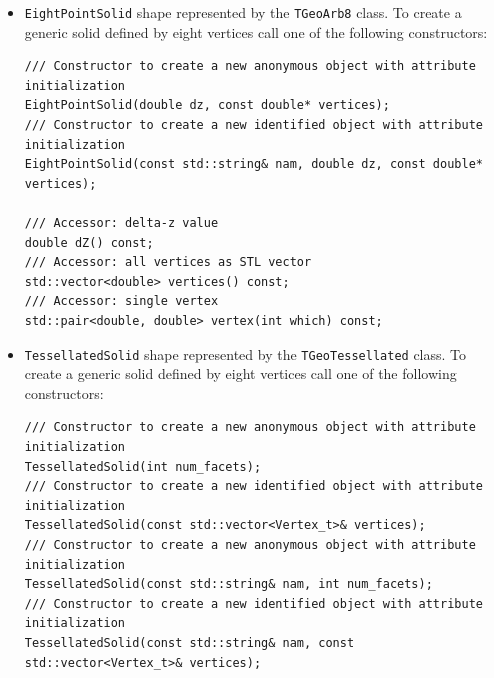 \begin{itemize}
\begin{verbatim}
/// Access vector of x parameters of the various vertices
std::vector<double> x() const;
/// Access vector of x parameters of the various vertices
std::vector<double> y() const;
/// Access vector of z-values of the z plane parameters
std::vector<double> z() const;
/// Access vector of x-offsets of the z plane parameters
std::vector<double> zx() const;
/// Access vector of y-offsets of the z plane parameters
std::vector<double> zy() const;
/// Access vector of z-scale parameters
std::vector<double> zscale() const;
\end{verbatim}

\item \texttt{EightPointSolid} shape represented by the \texttt{TGeoArb8} class. To create a generic solid defined by eight vertices call one of the following constructors:
\begin{verbatim}
/// Constructor to create a new anonymous object with attribute initialization
EightPointSolid(double dz, const double* vertices);
/// Constructor to create a new identified object with attribute initialization
EightPointSolid(const std::string& nam, double dz, const double* vertices);

/// Accessor: delta-z value
double dZ() const;
/// Accessor: all vertices as STL vector
std::vector<double> vertices() const;
/// Accessor: single vertex
std::pair<double, double> vertex(int which) const;
\end{verbatim}

\item \texttt{TessellatedSolid} shape represented by the \texttt{TGeoTessellated} class. To create a generic solid defined by eight vertices call one of the following constructors:
\begin{verbatim}
/// Constructor to create a new anonymous object with attribute initialization
TessellatedSolid(int num_facets);
/// Constructor to create a new identified object with attribute initialization
TessellatedSolid(const std::vector<Vertex_t>& vertices);
/// Constructor to create a new anonymous object with attribute initialization
TessellatedSolid(const std::string& nam, int num_facets);
/// Constructor to create a new identified object with attribute initialization
TessellatedSolid(const std::string& nam, const std::vector<Vertex_t>& vertices);


\end{verbatim}
\end{itemize}
